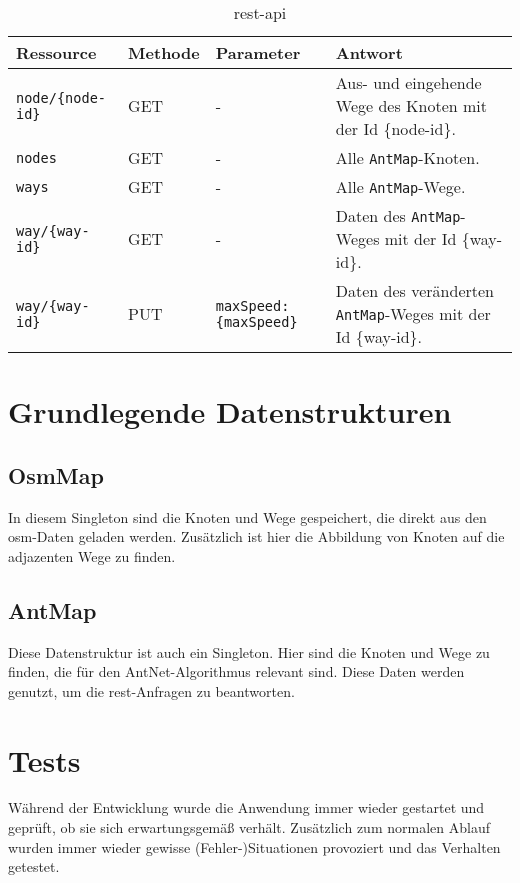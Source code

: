 \begin{table}[htbp]
  \centering
  \begin{tabularx}{\textwidth}{lllX}
    Ressource & Methode & Parameter & Antwort \\
    \toprule
    \texttt{node/\{node-id\}} & GET & - & Aus- und eingehende Wege des Knoten mit der Id \{node-id\}. \\
    \midrule
    \texttt{nodes} & GET & - & Alle \texttt{AntMap}-Knoten. \\
    \midrule
    \texttt{ways} & GET & - & Alle \texttt{AntMap}-Wege. \\
    \midrule
    \texttt{way/\{way-id\}} & GET & - & Daten des \texttt{AntMap}-Weges mit der Id \{way-id\}. \\
    \midrule
    \texttt{way/\{way-id\}} & PUT & \texttt{maxSpeed: \{maxSpeed\}} & Daten des veränderten \texttt{AntMap}-Weges mit der Id \{way-id\}. \\
    \bottomrule
  \end{tabularx}
  \caption{\acs*{rest}-\acs*{api}}
  \label{tab:rest-api}
\end{table}

\section{Grundlegende Datenstrukturen}
\label{sec:grundlegende-datenstrukturen}

\subsection{OsmMap}
\label{sec:osm-map}

In diesem Singleton sind die Knoten und Wege gespeichert, die direkt aus den \ac{osm}-Daten geladen werden.
Zusätzlich ist hier die Abbildung von Knoten auf die adjazenten Wege zu finden.

\subsection{AntMap}
\label{sec:ant-map}

Diese Datenstruktur ist auch ein Singleton.
Hier sind die Knoten und Wege zu finden, die für den AntNet-Algorithmus relevant sind.
Diese Daten werden genutzt, um die \ac{rest}-Anfragen zu beantworten.

\section{Tests}
\label{sec:tests}

Während der Entwicklung wurde die Anwendung immer wieder gestartet und geprüft, ob sie sich erwartungsgemäß verhält.
Zusätzlich zum normalen Ablauf wurden immer wieder gewisse (Fehler-)Situationen provoziert und das Verhalten getestet.
